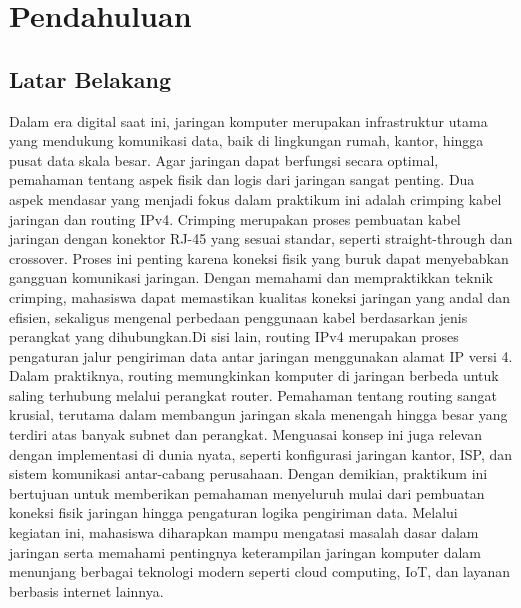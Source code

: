 \section{Pendahuluan}
\subsection{Latar Belakang}
Dalam era digital saat ini, jaringan komputer merupakan infrastruktur utama yang mendukung komunikasi data, baik di lingkungan rumah, kantor, hingga pusat data skala besar. Agar jaringan dapat berfungsi secara optimal, pemahaman tentang aspek fisik dan logis dari jaringan sangat penting. Dua aspek mendasar yang menjadi fokus dalam praktikum ini adalah crimping kabel jaringan dan routing IPv4. Crimping merupakan proses pembuatan kabel jaringan dengan konektor RJ-45 yang sesuai standar, seperti straight-through dan crossover. Proses ini penting karena koneksi fisik yang buruk dapat menyebabkan gangguan komunikasi jaringan. Dengan memahami dan mempraktikkan teknik crimping, mahasiswa dapat memastikan kualitas koneksi jaringan yang andal dan efisien, sekaligus mengenal perbedaan penggunaan kabel berdasarkan jenis perangkat yang dihubungkan.Di sisi lain, routing IPv4 merupakan proses pengaturan jalur pengiriman data antar jaringan menggunakan alamat IP versi 4. Dalam praktiknya, routing memungkinkan komputer di jaringan berbeda untuk saling terhubung melalui perangkat router. Pemahaman tentang routing sangat krusial, terutama dalam membangun jaringan skala menengah hingga besar yang terdiri atas banyak subnet dan perangkat. Menguasai konsep ini juga relevan dengan implementasi di dunia nyata, seperti konfigurasi jaringan kantor, ISP, dan sistem komunikasi antar-cabang perusahaan. Dengan demikian, praktikum ini bertujuan untuk memberikan pemahaman menyeluruh mulai dari pembuatan koneksi fisik jaringan hingga pengaturan logika pengiriman data. Melalui kegiatan ini, mahasiswa diharapkan mampu mengatasi masalah dasar dalam jaringan serta memahami pentingnya keterampilan jaringan komputer dalam menunjang berbagai teknologi modern seperti cloud computing, IoT, dan layanan berbasis internet lainnya.

